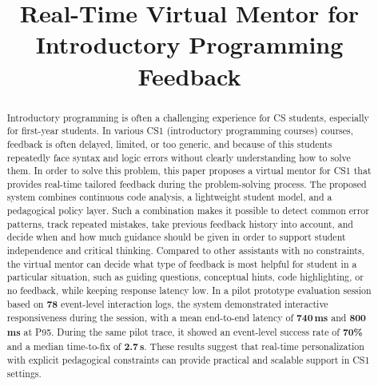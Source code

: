 \documentclass[conference]{IEEEtran}
\begin{document}
\title{Real-Time Virtual Mentor for Introductory Programming Feedback}

\author{
    \and
}

\maketitle

\begin{abstract}
Introductory programming is often a challenging experience for CS students, especially for first-year students. In various CS1 (introductory programming courses) courses, feedback is often delayed, limited, or too generic, and because of this students repeatedly face syntax and logic errors without clearly understanding how to solve them. In order to solve this problem, this paper proposes a virtual mentor for CS1 that provides real-time tailored feedback during the problem-solving process. The proposed system combines continuous code analysis, a lightweight student model, and a pedagogical policy layer. Such a combination makes it possible to detect common error patterns, track repeated mistakes, take previous feedback history into account, and decide when and how much guidance should be given in order to support student independence and critical thinking. Compared to other assistants with no constraints, the virtual mentor can decide what type of feedback is most helpful for student in a particular situation, such as guiding questions, conceptual hints, code highlighting, or no feedback, while keeping response latency low. In a pilot prototype evaluation session based on \textbf{78} event-level interaction logs, the system demonstrated interactive responsiveness during the session, with a mean end-to-end latency of \textbf{740\,ms} and \textbf{800\,ms} at P95. During the same pilot trace, it showed an event-level success rate of \textbf{70\%} and a median time-to-fix of \textbf{2.7\,s}. These results suggest that real-time personalization with explicit pedagogical constraints can provide practical and scalable support in CS1 settings.
\end{abstract}
\end{document}
